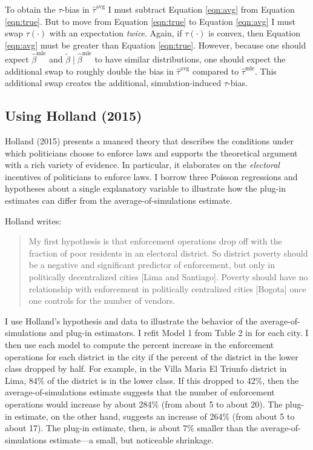 \documentclass[12pt]{article}
\begin{document}
To obtain the $\tau$-bias in $\hat{\tau}^\text{avg}$ I must subtract Equation \ref{eqn:avg} from Equation \ref{eqn:true}.
But to move from Equation \ref{eqn:true} to Equation \ref{eqn:avg} I must swap $\tau(\cdot)$ with an expectation \emph{twice}.
Again, if $\tau(\cdot)$ is convex, then Equation \ref{eqn:avg} must be greater than Equation \ref{eqn:true}.
However, because one should expect $\hat{\beta}^\text{mle}$ and $\tilde{\beta} \mid \hat{\beta}^\text{mle}$ to have similar distributions, one should expect the additional swap to roughly double the bias in $\hat{\tau}^\text{avg}$ compared to $\hat{\tau}^\text{mle}$. This additional swap creates the additional, simulation-induced $\tau$-bias.

\subsection*{Using Holland (2015)}

Holland (2015) presents a nuanced theory that describes the conditions under which politicians choose to enforce laws and supports the theoretical argument with a rich variety of evidence. In particular, it elaborates on the \textit{electoral} incentives of politicians to enforce laws. I borrow three Poisson regressions and hypotheses about a single explanatory variable to illustrate how the plug-in estimates can differ from the average-of-simulations estimate.

Holland writes: 
\begin{quote}
My first hypothesis is that enforcement operations drop off with the fraction of poor residents in an electoral district. So district poverty should be a negative and significant predictor of enforcement, but only in politically decentralized cities [Lima and Santiago]. Poverty should have no relationship with enforcement in politically centralized cities [Bogota] once one controls for the number of vendors.
\end{quote}

I use Holland's hypothesis and data to illustrate the behavior of the average-of-simulations and plug-in estimators. I refit Model 1 from Table 2 in \cite{Holland2015} for each city. I then use each model to compute the percent increase in the enforcement operations for each district in the city if the percent of the district in the lower class dropped by half. For example, in the Villa Maria El Triunfo district in Lima, 84\% of the district is in the lower class. If this dropped to 42\%, then the average-of-simulations estimate suggests that the number of enforcement operations would increase by about 284\% (from about 5 to about 20). The plug-in estimate, on the other hand, suggests an increase of 264\% (from about 5 to about 17). The plug-in estimate, then, is about 7\% smaller than the average-of-simulations estimate---a small, but noticeable shrinkage. 
\end{document}
